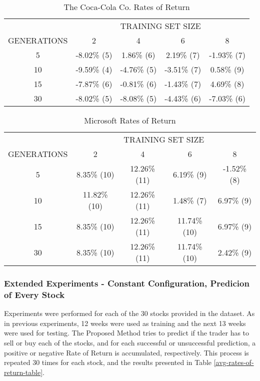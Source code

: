 \documentclass[12pt,journal,draftcls,onecolumn]{IEEEtran}
\begin{document}
\begin{table}
\caption{The Coca-Cola Co. Rates of Return}
\label{ko-ror-table}
    \begin{tabular}{ c c c c c }
         & \multicolumn{4}{c}{TRAINING SET SIZE} \\ 
        GENERATIONS & 2            & 4           & 6             & 8           \\ 
        5           & -8.02\% (5)  & 1.86\% (6)  & 2.19\% (7)    & -1.93\% (7) \\ 
        10          & -9.59\% (4)  & -4.76\% (5) & -3.51\% (7)   & 0.58\% (9) \\ 
        15          & -7.87\% (6)  & -0.81\% (6) & -1.43\% (7)   & 4.69\% (8) \\ 
        30          & -8.02\% (5)  & -8.08\% (5) & -4.43\% (6)   & -7.03\% (6)  \\ 
    \end{tabular} 
\end{table}

\begin{table}
\caption{Microsoft Rates of Return}
\label{msft-ror-table}
    \begin{tabular}{ c c c c c }
         & \multicolumn{4}{c}{TRAINING SET SIZE} \\ 
        GENERATIONS & 2            & 4           & 6             & 8           \\ 
        5           & 8.35\% (10)  & 12.26\% (11) & 6.19\% (9)   & -1.52\% (8) \\ 
        10          & 11.82\% (10) & 12.26\% (11) & 1.48\% (7)   & 6.97\% (9) \\ 
        15          & 8.35\% (10)  & 12.26\% (11) & 11.74\% (10) & 6.97\% (9) \\ 
        30          & 8.35\% (10)  & 12.26\% (11) & 11.74\% (10) & 2.42\% (9)  \\ 
    \end{tabular} 
\end{table}

\subsubsection{Extended Experiments - Constant Configuration, Predicion of Every Stock}

Experiments were performed for each of the 30 stocks provided in the dataset. As in previous experiments, 12 weeks were used as training and the next 13 weeks were used for testing. The Proposed Method tries to predict if the trader has to sell or buy each of the stocks, and for each successful or unsuccessful prediction, a positive or negative Rate of Return is accumulated, respectively. This process is repeated 30 times for each stock, and the results presented in Table \ref{avg-rates-of-return-table}.
\end{document}
